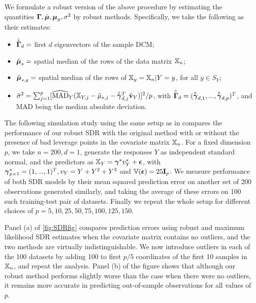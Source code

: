 We formulate a robust version of the above procedure by estimating the quantities ${\boldsymbol{\Gamma}}, \bar{{\boldsymbol{\mu}}}, {\boldsymbol{\mu}}_y, \sigma^2$ by robust methods. Specifically, we take the following as their estimates:
%
\begin{itemize}
\item $\hat {\tilde {{\boldsymbol{\Gamma}}}}_d = $ first $d$ eigenvectors of the sample DCM;
%
\item $\hat {{\boldsymbol{\mu}}}_s = $ spatial median of the rows of the data matrix ${\mathbb{X}}_n$;
%
\item $\hat {{\boldsymbol{\mu}}}_{s,y} = $ spatial median of the rows of $ {\mathbb{X}}_y = {\mathbb{X}}_n | Y=y$, for all $y \in S_Y$;
%
\item $\tilde\sigma^2 = \sum_{j=1}^p [\widehat{\text{MAD}}_Y ({\mathbb{X}}_{Y,j} - \hat \mu_{s,j} - \hat {\tilde {{\boldsymbol{\gamma}}}}_{d,j}^T \tilde {{\bf{v}}}_Y)]^2/p$, with $\hat {\tilde {{\boldsymbol{\Gamma}}}}_d = (\hat {\tilde {{\boldsymbol{\gamma}}}}_{d,1}, ..., \hat {\tilde{{\boldsymbol{\gamma}}}}_{d,p} )^T$, and MAD being the median absolute deviation.
\end{itemize}
%
The following simulation study using the same setup as in \citep{AdragniCook09} compares the performance of our robust SDR with the original method with or without the presence of bad leverage points in the covariate matrix ${\mathbb{X}}_n$. For a fixed dimension $p$, we take $n=200, d=1$, generate the responses $Y$ as independent standard normal, and the predictors as ${\mathbb{X}}_Y = {\boldsymbol{\gamma}}^* v_Y^* + {\boldsymbol{\epsilon}}$, with ${\boldsymbol{\gamma}}^*_{p\times 1} = (1,...,1)^T, v_Y = Y + Y^2 + Y^3$ and $ {\mathbb{V}} ({\boldsymbol{\epsilon}}) = 25 {\mathbf{I}}_p$. We measure performance of both SDR models by their mean squared prediction error on another set of 200 observations generated similarly, and taking the average of these errors on 100 such training-test pair of datasets. Finally we repeat the whole setup for different choices of $p = 5,10,25,50,75,100,125,150$.

Panel (a) of \ref{fig:SDRfig} compares prediction errors using robust and maximum likelihood SDR estimates when the covariate matrix contains no outliers, and the two methods are virtually indistinguishable. We now introduce outliers in each of the 100 datasets by adding 100 to first $p/5$ coordinates of the first 10 samples in ${\mathbb{X}}_n$, and repeat the analysis. Panel (b) of the figure shows that although our robust method performs slightly worse than the case when there were no outliers, it remains more accurate in predicting out-of-sample observations for all values of $p$. 